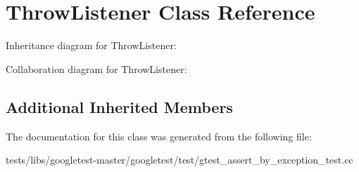 \hypertarget{classThrowListener}{}\section{Throw\+Listener Class Reference}
\label{classThrowListener}


Inheritance diagram for Throw\+Listener\+:


Collaboration diagram for Throw\+Listener\+:
\subsection*{Additional Inherited Members}


The documentation for this class was generated from the following file\+:\begin{DoxyCompactItemize}
\item 
tests/libs/googletest-\/master/googletest/test/gtest\+\_\+assert\+\_\+by\+\_\+exception\+\_\+test.\+cc\end{DoxyCompactItemize}
